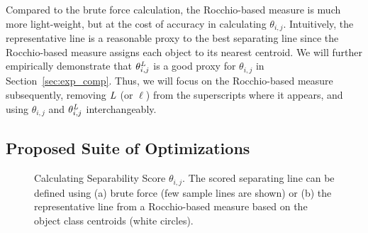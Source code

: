  Compared to the brute force calculation, the Rocchio-based measure is much more light-weight, but at the cost of accuracy in calculating $\theta_{i,j}$. Intuitively, the representative line is a reasonable proxy to the best separating line since the Rocchio-based measure assigns each object to its nearest centroid. We will further empirically demonstrate that $\theta_{i,j}^{\mathit{L}}$ is a good proxy for $\theta_{i,j}$ in Section~\ref{sec:exp_comp}. Thus, we will focus on the Rocchio-based measure subsequently, removing $\mathit{L}$ (or $\ell$) from the superscripts where it appears, and using $\theta_{i,j}$ and $\theta_{i,j}^{\mathit{L}}$ interchangeably.


\subsection{Proposed Suite of Optimizations}\label{sec:opt}


\begin{figure}[t!]
\centering %
\vspace{-2mm}
\vspace{-5mm}
\caption{Calculating Separability Score $\theta_{i,j}$. The scored separating line can be defined using (a) brute force (few sample lines are shown) or (b) the representative line from a Rocchio-based measure based on the object class centroids (white circles).}
\vspace{-5mm}
\label{fig:metric}
\end{figure}

